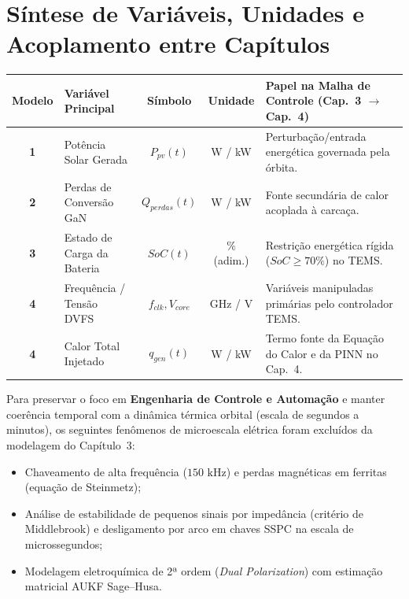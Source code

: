 \documentclass[11pt,a4paper]{article}
\begin{document}
\section{Síntese de Variáveis, Unidades e Acoplamento entre Capítulos}

\begin{table}[h!]
\centering
\small
\renewcommand{\arraystretch}{1.15}
\begin{tabularx}{\textwidth}{clccX}
    \toprule
    \textbf{Modelo} & \textbf{Variável Principal} & \textbf{Símbolo} & \textbf{Unidade} & \textbf{Papel na Malha de Controle (Cap.~3 $\to$ Cap.~4)} \\
    \midrule
    \textbf{1} & Potência Solar Gerada & $P_{pv}(t)$ & W / kW & Perturbação/entrada energética governada pela órbita. \\
    \textbf{2} & Perdas de Conversão GaN & $Q_{perdas}(t)$ & W / kW & Fonte secundária de calor acoplada à carcaça. \\
    \textbf{3} & Estado de Carga da Bateria & $SoC(t)$ & \% (adim.) & Restrição energética rígida ($SoC \ge 70\%$) no TEMS. \\
    \textbf{4} & Frequência / Tensão DVFS & $f_{clk}, V_{core}$ & GHz / V & Variáveis manipuladas primárias pelo controlador TEMS. \\
    \textbf{4} & Calor Total Injetado & $q_{gen}(t)$ & W / kW & Termo fonte da Equação do Calor e da PINN no Cap.~4. \\
    \bottomrule
\end{tabularx}
\end{table}

\vspace{4pt}

\begin{tcolorbox}[colback=lightgray, colframe=darkgray, title=\color{darkgray}\textbf{FRONTEIRA DE ESCOPO (O QUE FOI DELIBERADAMENTE SIMPLIFICADO NO CAPÍTULO 3)}]
\small
Para preservar o foco em \textbf{Engenharia de Controle e Automação} e manter coerência temporal com a dinâmica térmica orbital (escala de segundos a minutos), os seguintes fenômenos de microescala elétrica foram excluídos da modelagem do Capítulo~3:
\begin{itemize}[leftmargin=1.4em, itemsep=1pt, parsep=0pt]
    \item Chaveamento de alta frequência ($150\text{ kHz}$) e perdas magnéticas em ferritas (equação de Steinmetz);
    \item Análise de estabilidade de pequenos sinais por impedância (critério de Middlebrook) e desligamento por arco em chaves SSPC na escala de microssegundos;
    \item Modelagem eletroquímica de 2ª ordem (\textit{Dual Polarization}) com estimação matricial AUKF Sage--Husa.
\end{itemize}
\end{tcolorbox}
\end{document}
